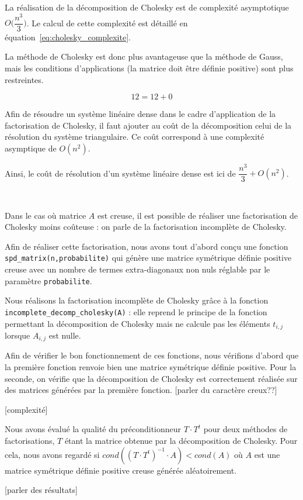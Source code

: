 \documentclass{article}
\begin{document}
La réalisation de la décomposition de Cholesky est de complexité asymptotique $O\Big(\dfrac{n^3}{3}\Big)$. Le calcul de cette complexité est détaillé en équation~\ref{eq:cholesky_complexite}.

La méthode de Cholesky est donc plus avantageuse que la méthode de Gauss, mais les conditions d'applications (la matrice doit être définie positive) sont plus restreintes.


\begin{equation}
  12 = 12 +0
  \label{eq:cholesky_complexite}
\end{equation}

Afin de résoudre un système linéaire dense dans le cadre d'application de la factorisation de Cholesky, il faut ajouter au coût de la décomposition celui de la résolution du système triangulaire. Ce coût correspond à une complexité asymptique de $O(n^2)$.

Ainsi, le coût de résolution d'un système linéaire dense est ici de $\dfrac{n^3}{3} + O(n^2)$.

\vskip 1mm ~

Dans le cas où matrice $A$ est creuse, il est possible de réaliser une factorisation de Cholesky moins coûteuse : on parle de la factorisation incomplète de Cholesky.

Afin de réaliser cette factorisation, nous avons tout d'abord conçu une fonction \verb|spd_matrix(n,probabilite)| qui génère une matrice symétrique définie positive creuse avec un nombre de termes extra-diagonaux non nuls réglable par le paramètre \verb|probabilite|.

Nous réalisons la factorisation incomplète de Cholesky grâce à la fonction \verb|incomplete_decomp_cholesky(A)| : elle reprend le principe de la fonction permettant la décomposition de Cholesky mais ne calcule pas les éléments $t_{i,j}$ lorsque $A_{i,j}$ est nulle.

Afin de vérifier le bon fonctionnement de ces fonctions, nous vérifions d'abord que la première fonction renvoie bien une matrice symétrique définie positive. Pour la seconde, on vérifie que la décomposition de Cholesky est correctement réalisée sur des matrices générées par la première fonction. [parler du caractère creux??]

[complexité]

Nous avons évalué la qualité du préconditionneur $T\cdot T^t$ pour deux méthodes de factorisations, $T$ étant la matrice obtenue par la décomposition de Cholesky. Pour cela, nous avons regardé si $cond((T\cdot T^t)^{-1}\cdot A) < cond(A)$ où $A$ est une matrice symétrique définie positive creuse générée aléatoirement.

[parler des résultats]
\end{document}
